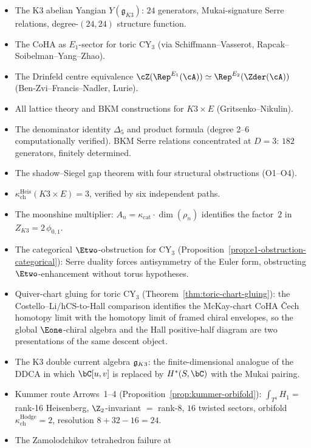 \begin{itemize}[leftmargin=1.5em,topsep=0.3ex,itemsep=0.2ex]
 properties (definition, bar complex, braiding).
 \item The K3 abelian Yangian $Y(\mathfrak{g}_{K3})$: $24$
 generators, Mukai-signature Serre relations,
 degree-$(24, 24)$ structure function.
 \item The CoHA as $E_1$-sector for toric CY$_3$ (via
 Schiffmann--Vasserot, Rapcak--Soibelman--Yang--Zhao).
 \item The Drinfeld centre equivalence
 $\cZ(\Rep^{E_1}(\cA)) \simeq \Rep^{E_2}(\Zder(\cA))$
 (Ben-Zvi--Francis--Nadler, Lurie).
 \item All lattice theory and BKM constructions for
 $K3 \times E$ (Gritsenko--Nikulin).
 \item The denominator identity $\Delta_5$ and product
 formula (degree 2--6 computationally verified). BKM Serre
 relations concentrated at $D = 3$: $182$ generators,
 finitely determined.
 \item The shadow--Siegel gap theorem with four structural
 obstructions (O1--O4).
 \item $\kappa_{\mathrm{ch}}^{\mathrm{Heis}}(K3 \times E) = 3$, verified by
 six independent paths.
 \item The moonshine multiplier: $A_n = \kappa_{\mathrm{cat}}
 \cdot \dim(\rho_n)$ identifies the factor~$2$ in
 $Z_{K3} = 2\,\phi_{0,1}$.
 \item The categorical $\Etwo$-obstruction for CY$_3$
 (Proposition~\ref{prop:e1-obstruction-categorical}):
 Serre duality forces antisymmetry of the Euler form,
 obstructing $\Etwo$-enhancement without torus
 hypotheses.
 \item Quiver-chart gluing for toric CY$_3$
 (Theorem~\ref{thm:toric-chart-gluing}): the Costello--Li/hCS-to-Hall
comparison identifies the McKay-chart CoHA \v Cech homotopy limit with the
 homotopy limit of framed chiral envelopes, so the global
 $\Eone$-chiral algebra and the Hall positive-half diagram are two
 presentations of the same descent object.
 \item The K3 double current algebra $\mathfrak{g}_{K3}$: the
 finite-dimensional analogue of the DDCA in which
 $\bC[u, v]$ is replaced by $H^*(S, \bC)$ with the Mukai
 pairing.
 \item Kummer route Arrows~1--4
 (Proposition~\ref{prop:kummer-orbifold}):
 $\int_{T^4} H_1 =$ rank-16 Heisenberg,
 $\Z_2$-invariant $=$ rank-8, $16$ twisted sectors,
 orbifold $\kappa_{\mathrm{ch}}^{\mathrm{Hodge}} = 2$, resolution
 $8 + 32 - 16 = 24$.
 \item The Zamolodchikov tetrahedron failure at

\end{itemize}
